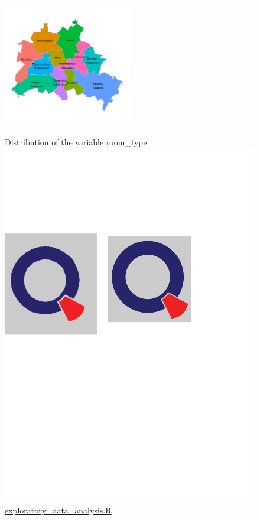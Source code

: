 \begin{figure}[H]
\begin{center}
\includegraphics[width=0.5\textwidth, keepaspectratio]{room_type_distribution.pdf} \\
\caption{Distribution of the variable room\_type \protect\includegraphics[scale=0.05]{qletlogo.pdf} {\href{https://github.com/silvia-ventoruzzo/SPL-WISE-2018/blob/master/exploratory_data_analysis.R}{exploratory\_data\_analysis.R}}}
\label{figure:room_type}
\end{center}
\end{figure}

